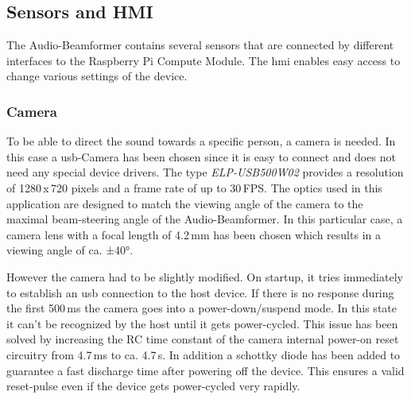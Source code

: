 \subsection{Sensors and HMI}
The Audio-Beamformer contains several sensors that are connected by different interfaces to the Raspberry Pi Compute Module. The \acrfull{hmi} enables easy access to change various settings of the device.

\subsubsection{Camera}
To be able to direct the sound towards a specific person, a camera is needed. In this case a \acrshort{usb}-Camera has been chosen since it is easy to connect and does not need any special device drivers. The type \textit{ELP-USB500W02} provides a resolution of 1280\,x\,720 pixels and a frame rate of up to 30\,FPS. The optics used in this application are designed to match the viewing angle of the camera to the maximal beam-steering angle of the Audio-Beamformer. In this particular case, a camera lens with a focal length of 4.2\,mm has been chosen which results in a viewing angle of ca. ±40°.

However the camera had to be slightly modified. On startup, it tries immediately to establish an \acrshort{usb} connection to the host device. If there is no response during the first 500\,ms the camera goes into a power-down/suspend mode. In this state it can't be recognized by the host until it gets power-cycled. This issue has been solved by increasing the RC time constant of the camera internal power-on reset circuitry from 4.7\,ms to ca. 4.7\,s. In addition a schottky diode has been added to guarantee a fast discharge time after powering off the device. This ensures a valid reset-pulse even if the device gets power-cycled very rapidly.

